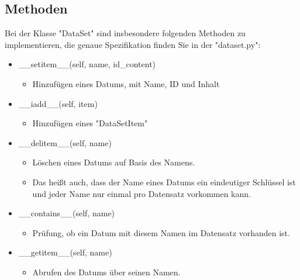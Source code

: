 \documentclass[
10pt,
a4paper
parskip=full
]{scrartcl}
\begin{document}
        \subsection{Methoden}
        Bei der Klasse "DataSet" sind insbesondere folgenden Methoden zu implementieren, die genaue Spezifikation finden Sie in der "dataset.py":

        \begin{itemize}
            \item \_\_setitem\_\_(self, name, id\_content)
                \begin{itemize}
                    \item [] Hinzufügen eines Datums, mit Name, ID und Inhalt
                \end{itemize}
                
            \item \_\_iadd\_\_(self, item)
                \begin{itemize}
                    \item [] Hinzufügen eines "DataSetItem"
                \end{itemize}
                
            \item \_\_delitem\_\_(self, name)
                \begin{itemize}
                    \item [] Löschen eines Datums auf Basis des Namens.
                    \item[] Das heißt auch, dass der Name eines Datums ein eindeutiger Schlüssel ist und jeder Name nur einmal pro Datensatz vorkommen kann.
                \end{itemize}
                
            \item \_\_contains\_\_(self, name)
                \begin{itemize}
                    \item [] Prüfung, ob ein Datum mit diesem Namen im Datensatz vorhanden ist.
                \end{itemize}
                
            \item \_\_getitem\_\_(self, name)
                \begin{itemize}
                    \item [] Abrufen des Datums über seinen Namen.
                \end{itemize}


\end{itemize}
\end{document}

